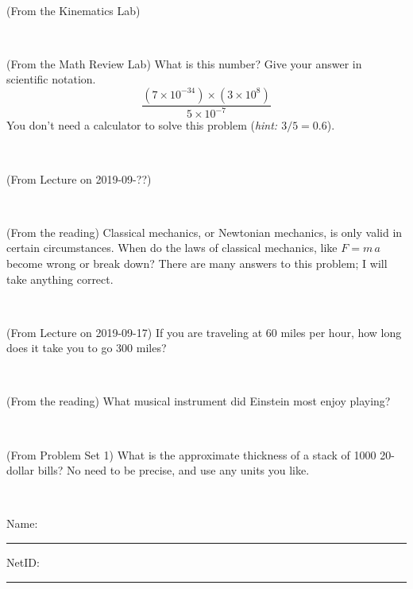 \documentclass[12pt, letterpaper]{article}
\begin{document}
\vfill ~

\begin{problem} (From the Kinematics Lab)

\end{problem}


\vfill ~

\begin{problem} (From the Math Review Lab)
What is this number? Give your answer in scientific notation.
$$
\frac{(7\times10^{-34})\times(3\times10^8)}{5\times10^{-7}}
$$
You don't need a calculator to solve this problem (\textit{hint: $3/5=0.6$}).
\end{problem}


\vfill ~

\begin{problem} (From Lecture on 2019-09-??)
\end{problem}


\vfill ~


\clearpage


\begin{problem} (From the reading)
Classical mechanics, or Newtonian mechanics, is only valid in certain
circumstances. When do the laws of classical mechanics, like $F =
m\,a$ become wrong or break down? There are many answers to this
problem; I will take anything correct.
\end{problem}


\vfill ~

\begin{problem} (From Lecture on 2019-09-17)
If you are traveling at 60 miles per hour, how long does
it take you to go 300 miles?
\end{problem}


\vfill ~

\begin{problem} (From the reading)
What musical instrument did Einstein most enjoy playing?
\end{problem}


\vfill ~

\begin{problem} (From Problem Set 1)
What is the approximate thickness of a stack of 1000 20-dollar bills?
No need to be precise, and use any units you like.
\end{problem}


\vfill ~


\cleardoublepage



\noindent
Name: \rule[-1ex]{0.60\textwidth}{0.1pt}
NetID: \rule[-1ex]{0.20\textwidth}{0.1pt}
\end{document}

